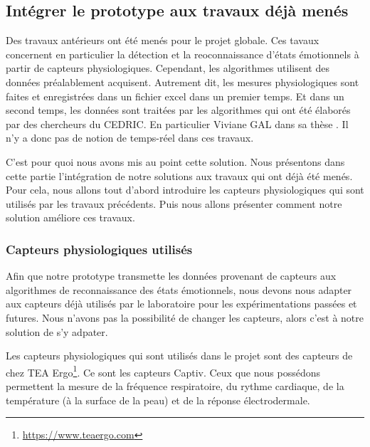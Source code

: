 \documentclass{article}
\begin{document}
	\subsection{Intégrer le prototype aux travaux déjà menés}\label{sec:travaux}
		Des travaux antérieurs ont été menés pour le projet globale.
		Ces tavaux concernent en particulier la détection et la reoconnaissance d'états émotionnels à partir de capteurs physiologiques.
		Cependant, les algorithmes utilisent des données préalablement acquisent.
		Autrement dit, les mesures physiologiques sont faites et enregistrées dans un fichier excel dans un premier temps.
		Et dans un second temps, les données sont traitées par les algorithmes qui ont été élaborés par des chercheurs du CEDRIC.
		En particulier Viviane GAL dans sa thèse \cite{gal_2019}.
		Il n'y a donc pas de notion de temps-réel dans ces travaux.\par
		C'est pour quoi nous avons mis au point cette solution.
		Nous présentons dans cette partie l'intégration de notre solutions aux travaux qui ont déjà été menés.
		Pour cela, nous allons tout d'abord introduire les capteurs physiologiques qui sont utilisés par les travaux précédents.
		Puis nous allons présenter comment notre solution améliore ces travaux.
		\subsubsection{Capteurs physiologiques utilisés}\label{sec:capteurs}
			Afin que notre prototype transmette les données provenant de capteurs aux algorithmes de reconnaissance des états émotionnels, nous devons nous adapter aux capteurs déjà utilisés par le laboratoire pour les expérimentations passées et futures.
			Nous n'avons pas la possibilité de changer les capteurs, alors c'est à notre solution de s'y adpater.\par
			Les capteurs physiologiques qui sont utilisés dans le projet sont des capteurs de chez TEA Ergo\footnote{\href{https://www.teaergo.com}{https://www.teaergo.com}}.
			Ce sont les capteurs Captiv.
			Ceux que nous possédons permettent la mesure de la fréquence respiratoire, du rythme cardiaque, de la température (à la surface de la peau) et de la réponse électrodermale.
\end{document}
